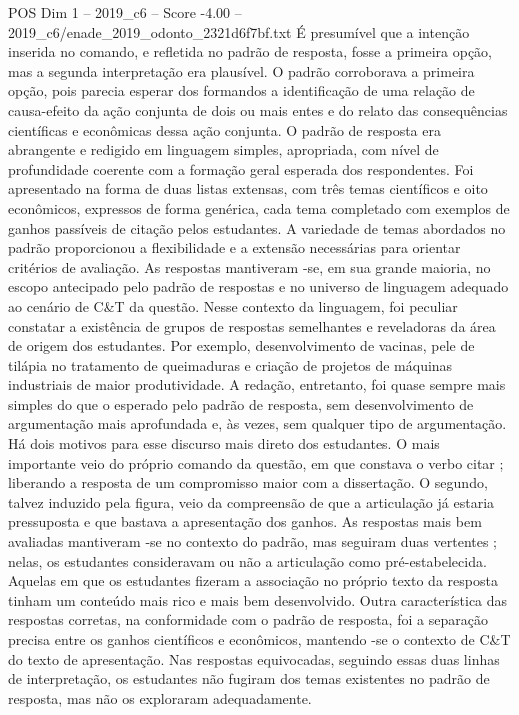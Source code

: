 \begin{textsample}{POS Dim 1 – 2019\_c6 – Score -4.00 – 2019\_c6/enade\_2019\_odonto\_2321d6f7bf.txt}
É presumível que a intenção inserida no comando, e refletida no padrão de resposta, fosse a primeira opção, mas a segunda interpretação era plausível.
O padrão corroborava a primeira opção, pois parecia esperar dos formandos a identificação de uma relação de causa-efeito da ação conjunta de dois ou mais entes e do relato das consequências científicas e econômicas dessa ação conjunta.
O padrão de resposta era abrangente e redigido em linguagem simples, apropriada, com nível de profundidade coerente com a formação geral esperada dos respondentes.
Foi apresentado na forma de duas listas extensas, com três temas científicos e oito econômicos, expressos de forma genérica, cada tema completado com exemplos de ganhos passíveis de citação pelos estudantes.
A variedade de temas abordados no padrão proporcionou a flexibilidade e a extensão necessárias para orientar critérios de avaliação.
As respostas mantiveram -se, em sua grande maioria, no escopo antecipado pelo padrão de respostas e no universo de linguagem adequado ao cenário de C\&T da questão.
Nesse contexto da linguagem, foi peculiar constatar a existência de grupos de respostas semelhantes e reveladoras da área de origem dos estudantes.
Por exemplo, desenvolvimento de vacinas, pele de tilápia no tratamento de queimaduras e criação de projetos de máquinas industriais de maior produtividade.
A redação, entretanto, foi quase sempre mais simples do que o esperado pelo padrão de resposta, sem desenvolvimento de argumentação mais aprofundada e, às vezes, sem qualquer tipo de argumentação.
Há dois motivos para esse discurso mais direto dos estudantes.
O mais importante veio do próprio comando da questão, em que constava o verbo citar ; liberando a resposta de um compromisso maior com a dissertação.
O segundo, talvez induzido pela figura, veio da compreensão de que a articulação já estaria pressuposta e que bastava a apresentação dos ganhos.
As respostas mais bem avaliadas mantiveram -se no contexto do padrão, mas seguiram duas vertentes ; nelas, os estudantes consideravam ou não a articulação como pré-estabelecida.
Aquelas em que os estudantes fizeram a associação no próprio texto da resposta tinham um conteúdo mais rico e mais bem desenvolvido.
Outra característica das respostas corretas, na conformidade com o padrão de resposta, foi a separação precisa entre os ganhos científicos e econômicos, mantendo -se o contexto de C\&T do texto de apresentação.
Nas respostas equivocadas, seguindo essas duas linhas de interpretação, os estudantes não fugiram dos temas existentes no padrão de resposta, mas não os exploraram adequadamente.

\end{textsample}

